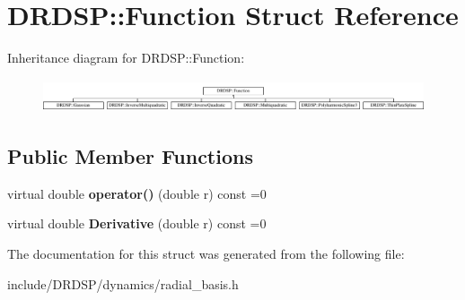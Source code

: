 \hypertarget{struct_d_r_d_s_p_1_1_function}{\section{D\-R\-D\-S\-P\-:\-:Function Struct Reference}
\label{struct_d_r_d_s_p_1_1_function}
}
Inheritance diagram for D\-R\-D\-S\-P\-:\-:Function\-:\begin{figure}[H]
\begin{center}
\leavevmode
\includegraphics[height=0.987654cm]{struct_d_r_d_s_p_1_1_function}
\end{center}
\end{figure}
\subsection*{Public Member Functions}
\begin{DoxyCompactItemize}
\item 
\hypertarget{struct_d_r_d_s_p_1_1_function_ab8c577c9d6cbcf89ae2da9092aaee7b6}{virtual double {\bfseries operator()} (double r) const =0}\label{struct_d_r_d_s_p_1_1_function_ab8c577c9d6cbcf89ae2da9092aaee7b6}

\item 
\hypertarget{struct_d_r_d_s_p_1_1_function_ac01b334d7ca8042e51c703760dc0a243}{virtual double {\bfseries Derivative} (double r) const =0}\label{struct_d_r_d_s_p_1_1_function_ac01b334d7ca8042e51c703760dc0a243}

\end{DoxyCompactItemize}


The documentation for this struct was generated from the following file\-:\begin{DoxyCompactItemize}
\item 
include/\-D\-R\-D\-S\-P/dynamics/radial\-\_\-basis.\-h\end{DoxyCompactItemize}
